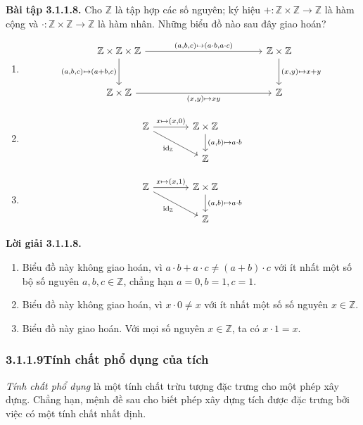 \noindent\textbf{Bài tập 3.1.1.8.} Cho $\mathbb Z$ là tập hợp các số nguyên; ký hiệu $+:\mathbb Z\times\mathbb Z\to\mathbb Z$ là hàm cộng và $\cdot:\mathbb Z\times\mathbb Z\to\mathbb Z$ là hàm nhân. Những biểu đồ nào sau đây giao hoán?
\begin{enumerate}[label=\alph*.]
\item %
\[\begin{tikzcd}[column sep=4.2cm,row sep=large]
\mathbb Z\times\mathbb Z\times\mathbb Z\arrow[r,"{(a,b,c)\mapsto(a\cdot b,a\cdot c)}"]\arrow[d,"{(a,b,c)\mapsto(a+b,c)}"']&\mathbb Z\times\mathbb Z\arrow[d,"{(x,y)\mapsto x+y}"]\\
\mathbb Z\times\mathbb Z\arrow[r,"{(x,y)\mapsto xy}"']&\mathbb Z
\end{tikzcd}\]
\item %
\[\begin{tikzcd}[column sep=large]\mathbb Z\arrow[r,"{x\mapsto(x,0)}"]\arrow[dr,"\mathrm{id}_{\mathbb Z}"']&\mathbb Z\times\mathbb Z\arrow[d,"{(a,b)\mapsto a\cdot b}"]\\&\mathbb Z\end{tikzcd}\]
\item %
\[\begin{tikzcd}[column sep=large]\mathbb Z\arrow[r,"{x\mapsto(x,1)}"]\arrow[dr,"\mathrm{id}_{\mathbb Z}"']&\mathbb Z\times\mathbb Z\arrow[d,"{(a,b)\mapsto a\cdot b}"]\\&\mathbb Z\end{tikzcd}\]
\end{enumerate}
\noindent\textbf{Lời giải 3.1.1.8.}\keepwithnext
\begin{enumerate}[label=\alph*.]
\item Biểu đồ này không giao hoán, vì $a\cdot b+a\cdot c\ne(a+b)\cdot c$ với ít nhất một số bộ số nguyên $a,b,c\in\mathbb Z$, chẳng hạn $a=0,b=1,c=1$.
\item Biểu đồ này không giao hoán, vì $x\cdot0\ne x$ với ít nhất một số số nguyên $x\in\mathbb Z$.
\item Biểu đồ này giao hoán. Với mọi số nguyên $x\in\mathbb Z$, ta có $x\cdot1=x$.
\end{enumerate}

\subsubsection*{3.1.1.9\quad Tính chất phổ dụng của tích}
\emph{Tính chất phổ dụng} là một tính chất trừu tượng đặc trưng cho một phép xây dựng. Chẳng hạn, mệnh đề sau cho biết phép xây dựng tích được đặc trưng bởi việc có một tính chất nhất định.

